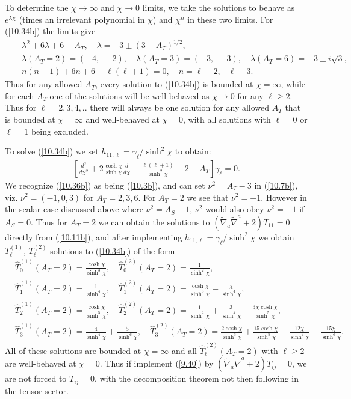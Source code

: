 \documentclass[aps,onecolumn,10pt]{revtex4}
\numberwithin{equation}{section}
\numberwithin{equation}{section}
\begin{document}
To determine the $\chi \rightarrow \infty$ and $\chi \rightarrow 0$ limits, we take the solutions to behave as $e^{\lambda\chi}$ (times an irrelevant polynomial in $\chi$) and $\chi^n$ in these two limits. For (\ref{10.34b}) the limits give
%
\begin{eqnarray}
&&\lambda^2+6\lambda+6+A_T,\quad \lambda=-3\pm(3-A_T)^{1/2},
\nonumber\\
&&\lambda(A_T=2)=(-4,~-2),\quad \lambda(A_T=3)=(-3,~-3),\quad \lambda(A_T=6)=-3\pm i\surd{3},
\nonumber\\
&&n(n-1)+6n+6-\ell(\ell+1)=0,\quad n=\ell-2, -\ell-3.
\label{10.35b}
\end{eqnarray}
%
Thus for any allowed $A_T$, every solution to (\ref{10.34b}) is bounded at $\chi=\infty$, while for each $A_T$ one of the solutions will be well-behaved as $\chi\rightarrow 0$ for any $\ell\geq 2$.  Thus for $\ell=2,3,4,..$  there will always be one solution for any allowed $A_T$ that is bounded at $\chi=\infty$ and well-behaved at $\chi=0$, with all solutions with $\ell=0$ or $\ell=1$ being excluded.

To solve (\ref{10.34b}) we set $h_{11,\ell}=\gamma_{\ell}/\sinh^2\chi$ to obtain:
%
\begin{eqnarray}
 \left[\frac{d^2}{d\chi^2}+2\frac{\cosh\chi}{\sinh\chi}\frac{d}{d\chi}
-\frac{\ell(\ell+1) }{ \sinh^2\chi}-2+A_T\right]\gamma_{\ell}=0.
\label{10.36b}
\end{eqnarray}
%
We recognize (\ref{10.36b}) as being (\ref{10.3b}), and can set $\nu^2=A_T-3$ in (\ref{10.7b}), viz. $\nu^2=(-1,0,3)$ for $A_T=2,3,6$. For $A_T=2$ we see that $\nu^2=-1$. However in the scalar case discussed above where $\nu^2=A_S-1$, $\nu^2$ would also obey $\nu^2=-1$ if $A_S=0$. Thus for $A_T=2$ we can obtain the solutions to $(\tilde{\nabla}_a\tilde{\nabla}^a+2)T_{11}=0$ directly from (\ref{10.11b}), and after implementing $h_{11,\ell}=\gamma_{\ell}/\sinh^2\chi$ we obtain $T^{(1)}_{\ell}$, $T^{(2)}_{\ell}$ solutions to (\ref{10.34b}) of the form 
%
\begin{align}
&\hat{T}^{(1)}_{0}(A_T=2)=\frac{\cosh\chi}{\sinh^3\chi},\quad \hat{T}^{(2)}_{0}(A_T=2)=\frac{1}{\sinh^2\chi},
\nonumber\\
&\hat{T}^{(1)}_{1}(A_T=2)=\frac{1}{\sinh^4\chi},\quad \hat{T}^{(2)}_{1}(A_T=2)=\frac{\cosh\chi}{\sinh^3\chi}-\frac{\chi}{\sinh^4\chi},
\nonumber\\
&\hat{T}^{(1)}_{2}(A_T=2)=\frac{\cosh\chi}{\sinh^5\chi},\quad \hat{T}^{(2)}_{2}(A_T=2)=\frac{1}{\sinh^2\chi}+\frac{3}{\sinh^4\chi}-\frac{3\chi\cosh\chi}{\sinh^5\chi},
\nonumber\\
&\hat{T}^{(1)}_{3}(A_T=2)=\frac{4}{\sinh^4\chi}+\frac{5}{\sinh^6\chi},\quad \hat{T}^{(2)}_{3}(A_T=2)=
\frac{2\cosh\chi}{\sinh^3\chi}+\frac{15\cosh\chi}{\sinh^5\chi}-\frac{12\chi}{\sinh^4\chi}-\frac{15\chi}{\sinh^6\chi}.
\label{10.37b}
\end{align}
%
All of these solutions are bounded at $\chi=\infty$ and all $\hat{T}^{(2)}_{\ell}(A_T=2)$ with $\ell\geq 2$ are well-behaved at $\chi=0$.  Thus if implement (\ref{9.40}) by $(\tilde{\nabla}_a\tilde{\nabla}^a+2)T_{ij}=0$,  we are not forced to $T_{ij}=0$, with the decomposition theorem not then following in the tensor sector.
\end{document}
